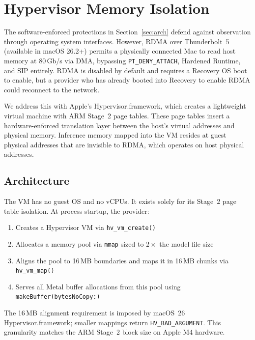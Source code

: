 \documentclass[10pt,twocolumn,letterpaper]{article}
\begin{document}
\section{Hypervisor Memory Isolation}
\label{sec:hypervisor}

The software-enforced protections in Section~\ref{sec:arch} defend against observation through operating system interfaces. However, RDMA over Thunderbolt~5 (available in macOS 26.2+) permits a physically connected Mac to read host memory at 80\,Gb/s via DMA, bypassing \texttt{PT\_DENY\_ATTACH}, Hardened Runtime, and SIP entirely. RDMA is disabled by default and requires a Recovery OS boot to enable, but a provider who has already booted into Recovery to enable RDMA could reconnect to the network.

We address this with Apple's Hypervisor.framework, which creates a lightweight virtual machine with ARM Stage~2 page tables. These page tables insert a hardware-enforced translation layer between the host's virtual addresses and physical memory. Inference memory mapped into the VM resides at guest physical addresses that are invisible to RDMA, which operates on host physical addresses.

\subsection{Architecture}

The VM has no guest OS and no vCPUs. It exists solely for its Stage~2 page table isolation. At process startup, the provider:
\begin{enumerate}[leftmargin=*,itemsep=1pt]
    \item Creates a Hypervisor VM via \texttt{hv\_vm\_create()}
    \item Allocates a memory pool via \texttt{mmap} sized to $2\times$ the model file size
    \item Aligns the pool to 16\,MB boundaries and maps it in 16\,MB chunks via \texttt{hv\_vm\_map()}
    \item Serves all Metal buffer allocations from this pool using \texttt{makeBuffer(bytesNoCopy:)}
\end{enumerate}

The 16\,MB alignment requirement is imposed by macOS~26 Hypervisor.framework; smaller mappings return \texttt{HV\_BAD\_ARGUMENT}. This granularity matches the ARM Stage~2 block size on Apple M4 hardware.
\end{document}
